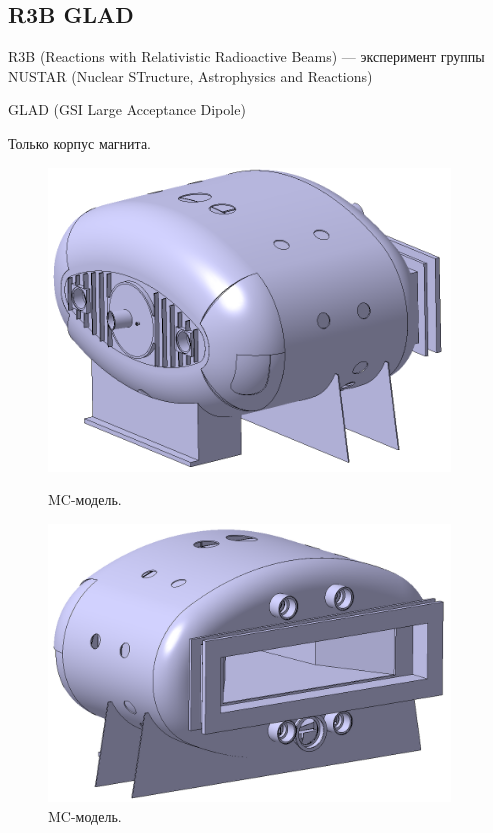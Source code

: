 \subsection{R3B GLAD}\label{sec:secGlad}

R3B (Reactions with Relativistic Radioactive Beams) --- эксперимент группы NUSTAR (Nuclear STructure, Astrophysics and Reactions)

GLAD (GSI Large Acceptance Dipole)

Только корпус магнита.

\begin{figure}[H]
\begin{minipage}[b]{0.495\textwidth}
\includegraphics[width=0.95\textwidth]{pictures/GLAD1.png}
\caption{MC-модель.}
\label{fig:GLAD1}
\end{minipage}
\hspace{0.01\textwidth}
\begin{minipage}[b]{0.495\textwidth}
\includegraphics[width=0.95\textwidth]{pictures/GLAD2.png}
\caption{MC-модель.}
\label{fig:GLAD2}
\end{minipage}


\end{figure}
